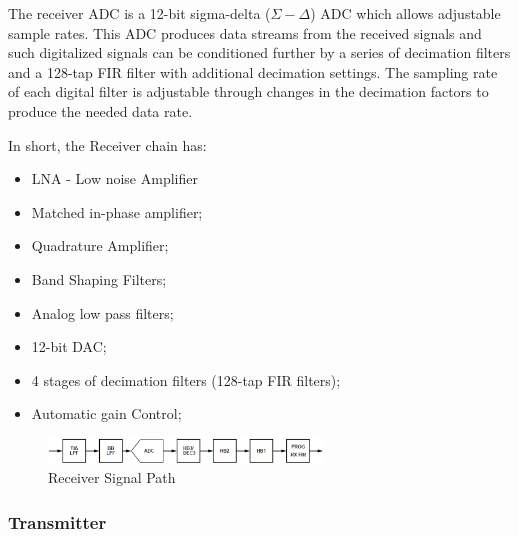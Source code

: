 The receiver ADC is a 12-bit sigma-delta ($\Sigma-\Delta$) ADC which allows adjustable sample rates. This ADC produces data streams from the received signals and such digitalized signals can be conditioned further by a series of decimation filters and a 128-tap FIR filter with additional decimation settings.
The sampling rate of each digital filter is adjustable through changes in the decimation factors to produce the needed data rate.

In short, the Receiver chain has:

\begin{itemize}
	\item LNA - Low noise Amplifier
	\item Matched in-phase amplifier;
	\item Quadrature Amplifier;
	\item Band Shaping Filters;
	\item Analog low pass filters;
	\item 12-bit DAC;
	\item 4 stages of decimation filters (128-tap FIR filters);
	\item Automatic gain Control;
\end{itemize}

\begin{figure}[htbp]
    \centering
    \includegraphics[width=0.65\textwidth]{./figures/rx_chain}
    \caption{ Receiver Signal Path
    \label{fig:rxchain}}
\end{figure}


\subsubsection{Transmitter}

